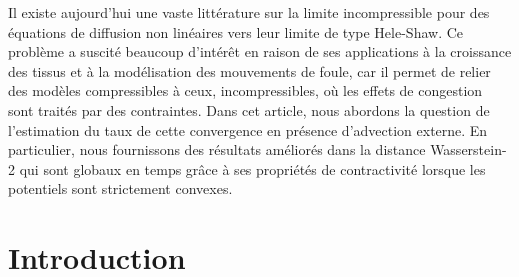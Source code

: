 \documentclass[JEP,XML,SOM,Unicode,published]{cedram}
\theoremstyle{plain}
\theoremstyle{remark}
\begin{document}




\begin{altabstract}
Il existe aujourd’hui une vaste littérature sur la limite incompressible pour des équations de diffusion non linéaires vers leur limite de type Hele-Shaw. Ce problème a suscité beaucoup d’intérêt en raison de ses applications à la croissance des tissus et à la modélisation des mouvements de foule, car il permet de relier des modèles compressibles à ceux, incompressibles, où les effets de congestion sont traités par des contraintes. Dans cet article, nous abordons la question de l’estimation du taux de cette convergence en présence d'advection externe. En particulier, nous fournissons des résultats améliorés dans la distance Wasserstein-2 qui sont globaux en temps grâce à ses propriétés de contractivité lorsque les potentiels sont strictement convexes.
\end{altabstract}

\maketitle
\vspace*{-\baselineskip}
\tableofcontents

\mainmatter
\section{Introduction}
\end{document}
